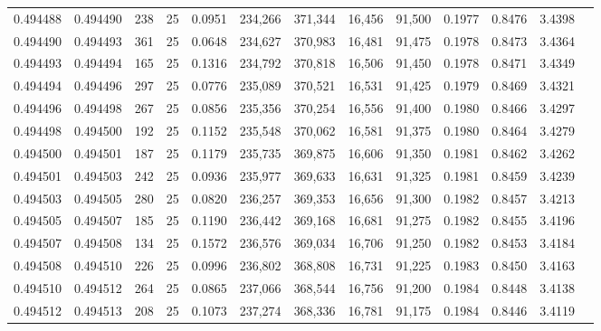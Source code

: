 \begin{tabular}{rrrrrrrrrrrrr}
0.494488 & 0.494490 &   238 &  25 &                                     0.0951 & 234,266 & 371,344 &  16,456 &  91,500 & 0.1977 & 0.8476 & 3.4398 \\
0.494490 & 0.494493 &   361 &  25 &                                     0.0648 & 234,627 & 370,983 &  16,481 &  91,475 & 0.1978 & 0.8473 & 3.4364 \\
0.494493 & 0.494494 &   165 &  25 &                                     0.1316 & 234,792 & 370,818 &  16,506 &  91,450 & 0.1978 & 0.8471 & 3.4349 \\
0.494494 & 0.494496 &   297 &  25 &                                     0.0776 & 235,089 & 370,521 &  16,531 &  91,425 & 0.1979 & 0.8469 & 3.4321 \\
0.494496 & 0.494498 &   267 &  25 &                                     0.0856 & 235,356 & 370,254 &  16,556 &  91,400 & 0.1980 & 0.8466 & 3.4297 \\
0.494498 & 0.494500 &   192 &  25 &                                     0.1152 & 235,548 & 370,062 &  16,581 &  91,375 & 0.1980 & 0.8464 & 3.4279 \\
0.494500 & 0.494501 &   187 &  25 &                                     0.1179 & 235,735 & 369,875 &  16,606 &  91,350 & 0.1981 & 0.8462 & 3.4262 \\
0.494501 & 0.494503 &   242 &  25 &                                     0.0936 & 235,977 & 369,633 &  16,631 &  91,325 & 0.1981 & 0.8459 & 3.4239 \\
0.494503 & 0.494505 &   280 &  25 &                                     0.0820 & 236,257 & 369,353 &  16,656 &  91,300 & 0.1982 & 0.8457 & 3.4213 \\
0.494505 & 0.494507 &   185 &  25 &                                     0.1190 & 236,442 & 369,168 &  16,681 &  91,275 & 0.1982 & 0.8455 & 3.4196 \\
0.494507 & 0.494508 &   134 &  25 &                                     0.1572 & 236,576 & 369,034 &  16,706 &  91,250 & 0.1982 & 0.8453 & 3.4184 \\
0.494508 & 0.494510 &   226 &  25 &                                     0.0996 & 236,802 & 368,808 &  16,731 &  91,225 & 0.1983 & 0.8450 & 3.4163 \\
0.494510 & 0.494512 &   264 &  25 &                                     0.0865 & 237,066 & 368,544 &  16,756 &  91,200 & 0.1984 & 0.8448 & 3.4138 \\
0.494512 & 0.494513 &   208 &  25 &                                     0.1073 & 237,274 & 368,336 &  16,781 &  91,175 & 0.1984 & 0.8446 & 3.4119 \\

\end{tabular}
